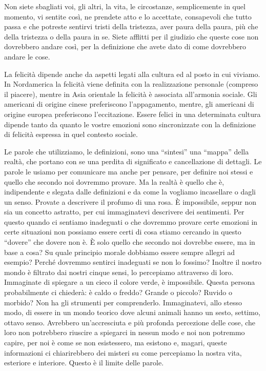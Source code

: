 \documentclass[12pt]{book} %
\begin{document}
Non siete sbagliati voi, gli altri, la vita, le circostanze, semplicemente in quel momento, vi sentite così, ne prendete
atto e lo accettate, consapevoli che tutto passa e che potreste sentirvi tristi della tristezza, aver paura della
paura, più che della tristezza o della paura in se. Siete afflitti per il giudizio che queste cose non dovrebbero
andare così, per la definizione che avete dato di come dovrebbero andare le cose. 

La felicità dipende anche da aspetti legati alla cultura ed al posto in cui viviamo. In Nordamerica la felicità viene
definita con la realizzazione personale (compreso il piacere), mentre in Asia orientale la felicità è associata
all'armonia sociale. Gli americani di origine cinese preferiscono
l'appagamento, mentre, gli americani di origine europea preferiscono
l'eccitazione.\newline
Essere felici in una determinata cultura dipende tanto da quanto le vostre emozioni sono sincronizzate con la
definizione di felicità espressa in quel contesto sociale. 

Le parole che utilizziamo, le definizioni, sono una “sintesi” una “mappa” della realtà, che portano con se una perdita
di significato e cancellazione di dettagli. Le parole le usiamo per comunicare ma anche per pensare, per definire noi
stessi e quello che secondo noi dovremmo provare. Ma la realtà è quello che è, indipendente e slegata dalle definizioni
e da come la vogliamo incasellare o dagli un senso. Provate a descrivere il profumo di una rosa. È impossibile, seppur
non sia un concetto astratto, per cui immaginatevi descrivere dei sentimenti. Per questo quando ci sentiamo inadeguati
o che dovremmo provare certe emozioni in certe situazioni non possiamo essere certi di cosa stiamo cercando in questo
“dovere” che dovere non è. È solo quello che secondo noi dovrebbe essere, ma in base a cosa? Su quale principio morale
dobbiamo essere sempre allegri ad esempio? Perché dovremmo sentirci inadeguati se non lo fossimo? Inoltre il nostro
mondo è filtrato dai nostri cinque sensi, lo percepiamo attraverso di loro. Immaginate di spiegare a un cieco il colore
verde, è impossibile. Questa persona probabilmente ci chiederà: è caldo o freddo? Grande o piccolo? Ruvido o morbido?
Non ha gli strumenti per comprenderlo. Immaginatevi, allo stesso modo, di essere in un mondo teorico dove alcuni
animali hanno un sesto, settimo, ottavo senso. Avrebbero un'accresciuta e più profonda percezione
delle cose, che loro non potrebbero riuscire a spiegarci in nessun modo e noi non potremmo capire, per noi è come se
non esistessero, ma esistono e, magari, queste informazioni ci chiarirebbero dei misteri su come percepiamo la nostra
vita, esteriore e interiore. Questo è il limite delle parole. 
\end{document}
